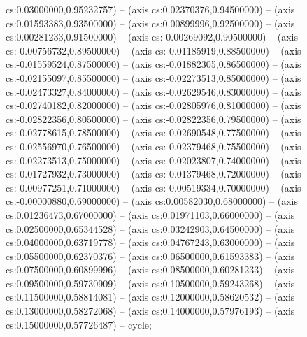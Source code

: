 cs:0.03000000,0.95232757) -- (axis cs:0.02370376,0.94500000) -- (axis cs:0.01593383,0.93500000) -- (axis cs:0.00899996,0.92500000) -- (axis cs:0.00281233,0.91500000) -- (axis cs:-0.00269092,0.90500000) -- (axis cs:-0.00756732,0.89500000) -- (axis cs:-0.01185919,0.88500000) -- (axis cs:-0.01559524,0.87500000) -- (axis cs:-0.01882305,0.86500000) -- (axis cs:-0.02155097,0.85500000) -- (axis cs:-0.02273513,0.85000000) -- (axis cs:-0.02473327,0.84000000) -- (axis cs:-0.02629546,0.83000000) -- (axis cs:-0.02740182,0.82000000) -- (axis cs:-0.02805976,0.81000000) -- (axis cs:-0.02822356,0.80500000) -- (axis cs:-0.02822356,0.79500000) -- (axis cs:-0.02778615,0.78500000) -- (axis cs:-0.02690548,0.77500000) -- (axis cs:-0.02556970,0.76500000) -- (axis cs:-0.02379468,0.75500000) -- (axis cs:-0.02273513,0.75000000) -- (axis cs:-0.02023807,0.74000000) -- (axis cs:-0.01727932,0.73000000) -- (axis cs:-0.01379468,0.72000000) -- (axis cs:-0.00977251,0.71000000) -- (axis cs:-0.00519334,0.70000000) -- (axis cs:-0.00000880,0.69000000) -- (axis cs:0.00582030,0.68000000) -- (axis cs:0.01236473,0.67000000) -- (axis cs:0.01971103,0.66000000) -- (axis cs:0.02500000,0.65344528) -- (axis cs:0.03242903,0.64500000) -- (axis cs:0.04000000,0.63719778) -- (axis cs:0.04767243,0.63000000) -- (axis cs:0.05500000,0.62370376) -- (axis cs:0.06500000,0.61593383) -- (axis cs:0.07500000,0.60899996) -- (axis cs:0.08500000,0.60281233) -- (axis cs:0.09500000,0.59730909) -- (axis cs:0.10500000,0.59243268) -- (axis cs:0.11500000,0.58814081) -- (axis cs:0.12000000,0.58620532) -- (axis cs:0.13000000,0.58272068) -- (axis cs:0.14000000,0.57976193) -- (axis cs:0.15000000,0.57726487) -- cycle;
